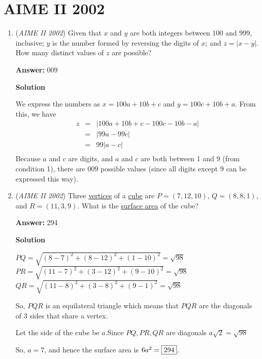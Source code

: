 \section{AIME II 2002}
        \begin{enumerate}
        	\item (\textit{AIME II 2002}) Given that $x$ and $y$ are both integers between $100$ and $999$, inclusive; $y$ is the number formed by reversing the digits of $x$; and $z=|x-y|$. How many distinct values of $z$ are possible?


 
 \textbf{Answer: }009



\textbf{Solution}

We express the numbers as $x=100a+10b+c$ and $y=100c+10b+a$.  From this, we have 
 \begin{eqnarray*}z&=&|100a+10b+c-100c-10b-a|\\&=&|99a-99c|\\&=&99|a-c|\\ \end{eqnarray*}Because $a$ and $c$ are digits, and $a$ and $c$ are both between 1 and 9 (from condition 1), there are $\boxed{009}$ possible values (since all digits except $9$ can be expressed this way).

 


	\item (\textit{AIME II 2002}) Three \href{https://artofproblemsolving.com/wiki/index.php?title=Vertex}{vertices} of a \href{https://artofproblemsolving.com/wiki/index.php?title=Cube}{cube} are $P=(7,12,10)$, $Q=(8,8,1)$, and $R=(11,3,9)$. What is the \href{https://artofproblemsolving.com/wiki/index.php?title=Surface\_area}{surface area} of the cube?


 
 \textbf{Answer: }294



\textbf{Solution}

$PQ=\sqrt{(8-7)^2+(8-12)^2+(1-10)^2}=\sqrt{98}$
$PR=\sqrt{(11-7)^2+(3-12)^2+(9-10)^2}=\sqrt{98}$
$QR=\sqrt{(11-8)^2+(3-8)^2+(9-1)^2}=\sqrt{98}$

 So, $PQR$ is an equilateral triangle which means that $PQR$ are the diagonals of 3 sides that share a vertex. 

 Let the side of the cube be $a$.Since $PQ,PR,QR$ are diagonals $a\sqrt{2}=\sqrt{98}$

 So, $a=7$, and hence the surface area is $6a^2=\framebox{294}$.


\end{enumerate}
